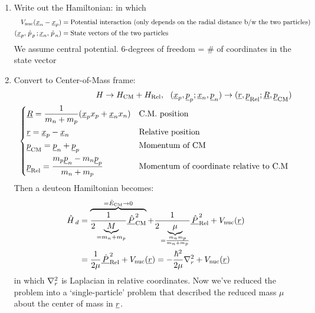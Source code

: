 \documentclass{school-22.101-notes}
\begin{document}
\begin{enumerate}
\item Write out the Hamiltonian: 
in which 
\begin{align}
 V_{\mathrm{nuc}} (\underline{x}_n - \underline{x}_p ) &= \mbox{Potential interaction (only depends on the radial distance b/w the two particles)} \\
 (\underline{x}_p, \left. \hat{p} \right._p; \underline{x}_n, \left. \hat{p} \right._n) &= \mbox{State vectors of the two particles} 
\end{align}
We assume central potential. 6-degrees of freedom = \# of coordinates in the state vector

\item Convert to Center-of-Mass frame: 
\begin{align}
 H \to H_{\mathrm{CM}} + H_{\mathrm{Rel}}, \fsp \fsp (\uline{x}_p, \uline{p}_p; \uline{x}_n, \uline{p}_n) \to (\uline{r}, \uline{p}_{\mathrm{Rel}}; \uline{R}, \uline{p}_{\mathrm{CM}} ) \\
\begin{dcases*} 
\uline{R} = \frac{1}{m_n + m_p} (\uline{x}_p x_p + \uline{x}_n x_n) & C.M. position\\
\uline{r} = \uline{x}_p - \uline{x}_n & Relative position \\
\uline{p}_{\mathrm{CM}} = \uline{p}_{n} + \uline{p}_p & Momentum of CM \\
\uline{p}_{\mathrm{Rel}} = \frac{m_p \uline{p}_n - m_n \uline{p}_p}{m_n + m_p} & Momentum of coordinate relative to C.M \\
\end{dcases*}
\end{align}
Then a deuteon Hamiltonian becomes:
\begin{align}
\left. \hat{H} \right._d &= \overbrace{\frac{1}{2 \underbrace{M}_{=m_n + m_p}} \underline{\left. \hat{P} \right.}_{\mathrm{CM}}^2}^{ = \hat{E}_{\mathrm{CM}} \to  0} + \frac{1}{2 \underbrace{\mu}_{=\frac{m_n m_p}{m_n + m_p}}} \underline{\left. \hat{P} \right.}_{\mathrm{Rel}}^2 + V_{\mathrm{nuc}} (\underline{r}) \\
&= \frac{1}{2 \mu} \underline{\left. \hat{P} \right.}_{\mathrm{Rel}}^2 + V_{\mathrm{nuc}} (\underline{r}) = -\frac{\hbar^2}{2 \mu} \nabla_r^2 + V_{\mathrm{nuc}} (\underline{r}) 
\end{align}
in which $\nabla_r^2$ is Laplacian in relative coordinates. Now we've reduced the problem into a `single-particle' problem that described the reduced mass $\mu$ about the center of mass in $\underline{r}$. 


\end{enumerate}
\end{document}
